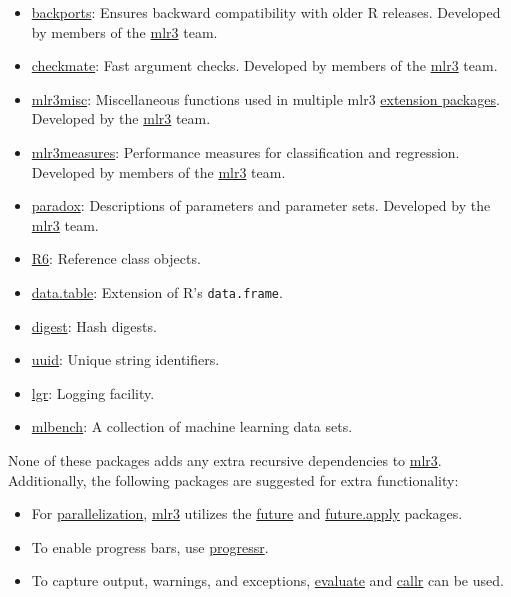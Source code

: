 \documentclass[
]{scrbook}
\providecommand{\tightlist}{%
  \setlength{\itemsep}{0pt}\setlength{\parskip}{0pt}}
\begin{document}
\begin{itemize}
\tightlist
\item
  \href{https://cran.r-project.org/package=backports}{backports}:
  Ensures backward compatibility with older R releases. Developed by members of the \href{https://mlr3.mlr-org.com}{mlr3} team.
\item
  \href{https://cran.r-project.org/package=checkmate}{checkmate}:
  Fast argument checks. Developed by members of the \href{https://mlr3.mlr-org.com}{mlr3} team.
\item
  \href{https://cran.r-project.org/package=mlr3misc}{mlr3misc}:
  Miscellaneous functions used in multiple mlr3 \href{https://github.com/mlr-org/mlr3/wiki/Extension-Packages}{extension packages}.
  Developed by the \href{https://mlr3.mlr-org.com}{mlr3} team.
\item
  \href{https://cran.r-project.org/package=mlr3measures}{mlr3measures}:
  Performance measures for classification and regression. Developed by members of the \href{https://mlr3.mlr-org.com}{mlr3} team.
\item
  \href{https://cran.r-project.org/package=paradox}{paradox}:
  Descriptions of parameters and parameter sets. Developed by the \href{https://mlr3.mlr-org.com}{mlr3} team.
\item
  \href{https://cran.r-project.org/package=R6}{R6}:
  Reference class objects.
\item
  \href{https://cran.r-project.org/package=data.table}{data.table}:
  Extension of R's \texttt{data.frame}.
\item
  \href{https://cran.r-project.org/package=digest}{digest}:
  Hash digests.
\item
  \href{https://cran.r-project.org/package=uuid}{uuid}:
  Unique string identifiers.
\item
  \href{https://cran.r-project.org/package=lgr}{lgr}:
  Logging facility.
\item
  \href{https://cran.r-project.org/package=mlbench}{mlbench}:
  A collection of machine learning data sets.
\end{itemize}

None of these packages adds any extra recursive dependencies to \href{https://mlr3.mlr-org.com}{mlr3}.
Additionally, the following packages are suggested for extra functionality:

\begin{itemize}
\tightlist
\item
  For \protect\hyperlink{parallelization}{parallelization}, \href{https://mlr3.mlr-org.com}{mlr3} utilizes the \href{https://cran.r-project.org/package=future}{future} and \href{https://cran.r-project.org/package=future.apply}{future.apply} packages.
\item
  To enable progress bars, use \href{https://cran.r-project.org/package=progressr}{progressr}.
\item
  To capture output, warnings, and exceptions, \href{https://cran.r-project.org/package=evaluate}{evaluate} and \href{https://cran.r-project.org/package=callr}{callr} can be used.
\end{itemize}
\end{document}
